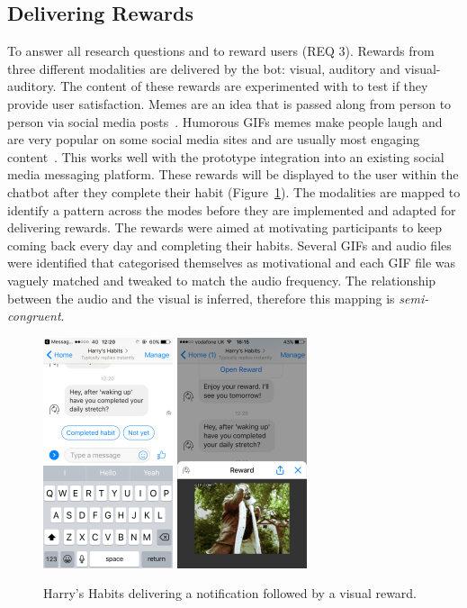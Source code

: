 \subsection*{Delivering Rewards}
To answer all research questions and to reward users (REQ 3). Rewards from three different modalities are delivered by the bot: visual, auditory and visual-auditory. The content of these rewards are experimented with to test if they provide user satisfaction. Memes are an idea that is passed along from person to person via social media posts~\cite{meme_definition}. Humorous GIFs memes make people laugh and are very popular on some social media sites and are usually most engaging content~\cite{meme_gifs_are_good}. This works well with the prototype integration into an existing social media messaging platform.
These rewards will be displayed to the user within the chatbot after they complete their habit (Figure~\ref{fig:delivering_reward}). The modalities are mapped to identify a pattern across the modes before they are implemented and adapted for delivering rewards. The rewards were aimed at motivating participants to keep coming back every day and completing their habits. Several GIFs and audio files were identified that categorised themselves as motivational and each GIF file was vaguely matched and tweaked to match the audio frequency. The relationship between the audio and the visual is inferred, therefore this mapping is \textit{semi-congruent}.

\begin{figure}[H]
  \centering
  \includegraphics[width=1.5in]{resources/figures/reminder.png}
  \hspace{10px}
  \includegraphics[width=1.5in]{resources/figures/reward-visual.png}
  \caption{Harry's Habits delivering a notification followed by a visual reward.}
  \label{fig:delivering_reward}
\end{figure}


